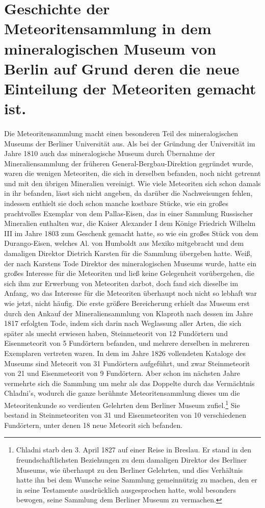\documentclass[a4paper, 11pt, oneside]{article}
\begin{document}
\section{Geschichte der Meteoritensammlung in dem mineralogischen Museum von Berlin auf Grund deren die neue Einteilung der Meteoriten gemacht ist.}
\paragraph{}
Die Meteoritensammlung macht einen besonderen Teil des mineralogischen Museums der Berliner Universität aus. Als bei der Gründung der Universität im Jahre 1810 auch das mineralogische Museum durch Übernahme der Mineraliensammlung der früheren General-Bergbau-Direktion gegründet wurde, waren die wenigen Meteoriten, die sich in derselben befanden, noch nicht getrennt und mit den übrigen Mineralien vereinigt. Wie viele Meteoriten sich schon damals in ihr befanden, lässt sich nicht angeben, da darüber die Nachweisungen fehlen, indessen enthielt sie doch schon manche kostbare Stücke, wie ein großes prachtvolles Exemplar von dem Pallas-Eisen, das in einer Sammlung Russischer Mineralien enthalten war, die Kaiser Alexander I dem Könige Friedrich Wilhelm III im Jahre 1803 zum Geschenk gemacht hatte, so wie ein großes Stück von dem Durango-Eisen, welches Al. von Humboldt aus Mexiko mitgebracht und dem damaligen Direktor Dietrich Karsten für die Sammlung übergeben hatte. Weiß, der nach Karstens Tode Direktor des mineralogischen Museums wurde, hatte ein großes Interesse für die Meteoriten und ließ keine Gelegenheit vorübergehen, die sich ihm zur Erwerbung von Meteoriten darbot, doch fand sich dieselbe im Anfang, wo das Interesse für die Meteoriten überhaupt noch nicht so lebhaft war wie jetzt, nicht häufig. Die erste größere Bereicherung erhielt das Museum erst durch den Ankauf der Mineraliensammlung von Klaproth nach dessen im Jahre 1817 erfolgten Tode, indem sich darin nach Weglassung aller Arten, die sich später als unecht erwiesen haben, Steinmeteorit von 12 Fundörtern und Eisenmeteorit von 5 Fundörtern befanden, und mehrere derselben in mehreren Exemplaren vertreten waren. In dem im Jahre 1826 vollendeten Kataloge des Museums sind Meteorit von 31 Fundörtern aufgeführt, und zwar Steinmeteorit von 21 und Eisenmeteorit von 9 Fundörtern. Aber schon im nächsten Jahre vermehrte sich die Sammlung um mehr als das Doppelte durch das Vermächtnis Chladni's, wodurch die ganze berühmte Meteoritensammlung dieses um die Meteoritenkunde so verdienten Gelehrten dem Berliner Museum zufiel.\footnote{Chladni starb den 3. April 1827 auf einer Reise in Breslau. Er stand in den freundschaftlichsten Beziehungen zu dem damaligen Direktor des Berliner Museums, wie überhaupt zu den Berliner Gelehrten, und dies Verhältnis hatte ihn bei dem Wunsche seine Sammlung gemeinnützig zu machen, den er in seine Testamente ausdrücklich ausgesprochen hatte, wohl besonders bewogen, seine Sammlung dem Berliner Museum zu vermachen.} Sie bestand in Steinmeteoriten von 31 und Eisenmeteoriten von 10 verschiedenen Fundörtern, unter denen 18 neue Meteorit sich befanden.
\end{document}
